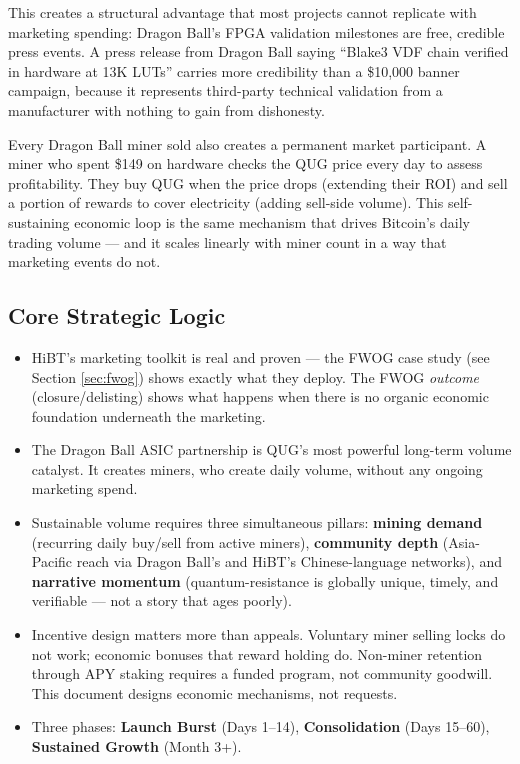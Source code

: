 \documentclass[11pt,a4paper]{article}
\begin{document}
This creates a structural advantage that most projects cannot replicate with marketing spending: Dragon Ball's FPGA validation milestones are free, credible press events. A press release from Dragon Ball saying ``Blake3 VDF chain verified in hardware at 13K LUTs'' carries more credibility than a \$10,000 banner campaign, because it represents third-party technical validation from a manufacturer with nothing to gain from dishonesty.

Every Dragon Ball miner sold also creates a permanent market participant. A miner who spent \$149 on hardware checks the QUG price every day to assess profitability. They buy QUG when the price drops (extending their ROI) and sell a portion of rewards to cover electricity (adding sell-side volume). This self-sustaining economic loop is the same mechanism that drives Bitcoin's daily trading volume — and it scales linearly with miner count in a way that marketing events do not.

\subsection{Core Strategic Logic}

\begin{itemize}[leftmargin=1.5em]
  \item HiBT's marketing toolkit is real and proven — the FWOG case study (see Section \ref{sec:fwog}) shows exactly what they deploy. The FWOG \emph{outcome} (closure/delisting) shows what happens when there is no organic economic foundation underneath the marketing.
  \item The Dragon Ball ASIC partnership is QUG's most powerful long-term volume catalyst. It creates miners, who create daily volume, without any ongoing marketing spend.
  \item Sustainable volume requires three simultaneous pillars: \textbf{mining demand} (recurring daily buy/sell from active miners), \textbf{community depth} (Asia-Pacific reach via Dragon Ball's and HiBT's Chinese-language networks), and \textbf{narrative momentum} (quantum-resistance is globally unique, timely, and verifiable — not a story that ages poorly).
  \item Incentive design matters more than appeals. Voluntary miner selling locks do not work; economic bonuses that reward holding do. Non-miner retention through APY staking requires a funded program, not community goodwill. This document designs economic mechanisms, not requests.
  \item Three phases: \textbf{Launch Burst} (Days 1--14), \textbf{Consolidation} (Days 15--60), \textbf{Sustained Growth} (Month 3+).
\end{itemize}
\end{document}
